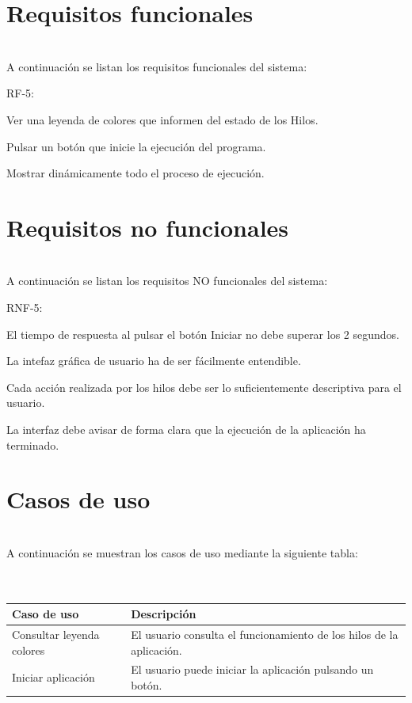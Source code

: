 \documentclass[12pt, a4paper, titlepage]{article}
\begin{document}
\section{Requisitos funcionales}
\noindent \\A continuación se listan los requisitos funcionales del sistema:\\
\begin{labeling}{ RF-5:} %
    \item[ \textbf{ RF-1}:] Ver una leyenda de colores que informen del estado de los Hilos.
    \item[ \textbf{ RF-2}:] Pulsar un botón que inicie la ejecución del programa.
    \item[ \textbf{ RF-3}:] Mostrar dinámicamente todo el proceso de ejecución.
\end{labeling}
\newpage

\section{Requisitos no funcionales}
\noindent \\A continuación se listan los requisitos NO funcionales del sistema:\\
\begin{labeling}{ RNF-5:}
    \item[ \textbf{RNF-1}:] El tiempo de respuesta al pulsar el botón Iniciar no debe superar los 2 segundos.
    \item[ \textbf{RNF-2}:] La intefaz gráfica de usuario ha de ser fácilmente entendible.
    \item[ \textbf{RNF-3}:] Cada acción realizada por los hilos debe ser lo suficientemente descriptiva para el usuario.
    \item[ \textbf{RNF-4}:] La interfaz debe avisar de forma clara que la ejecución de la aplicación ha terminado.
\end{labeling}
\newpage

\section{Casos de uso}
\noindent \\A continuación se muestran los casos de uso mediante la siguiente tabla:\\ \\ \\
\begin{tabular}{| m{5cm} | m{8cm} |} %
\hline %
\textbf{Caso de uso} & \textbf{Descripción} \\
\hline
Consultar leyenda colores & El usuario consulta el funcionamiento de los hilos de la aplicación. \\
\hline
Iniciar aplicación & El usuario puede iniciar la aplicación pulsando un botón. \\
\hline
\end{tabular}
\newpage
\end{document}
